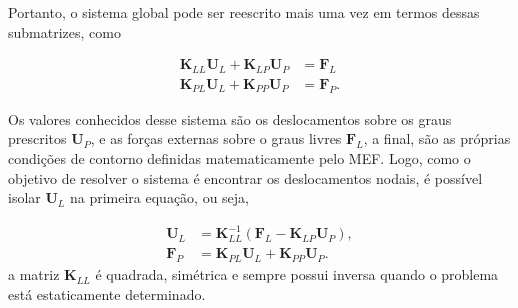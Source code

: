 Portanto, o sistema global pode ser reescrito mais uma vez em termos dessas submatrizes, como

\begin{align}
    \bm{K}_{LL} \bm{U}_L + \bm{K}_{LP} \bm{U}_P &= \bm{F}_L \\
    \bm{K}_{PL} \bm{U}_L + \bm{K}_{PP} \bm{U}_P &= \bm{F}_P.
\end{align}

Os valores conhecidos desse sistema são os deslocamentos sobre os graus prescritos $\bm{U}_P$, e as forças externas sobre o graus livres $\bm{F}_L$, a final, são as próprias condições de contorno definidas matematicamente pelo MEF. Logo, como o objetivo de resolver o sistema é encontrar os deslocamentos nodais, é possível isolar $\bm{U}_L$ na primeira equação, ou seja,

\begin{align}
    \bm{U}_L &= \bm{K}_{LL}^{-1} (\bm{F}_L - \bm{K}_{LP} \bm{U}_P), \\
    \bm{F}_P &= \bm{K}_{PL} \bm{U}_L + \bm{K}_{PP} \bm{U}_P.
\end{align}
a matriz $\bm{K}_{LL}$ é quadrada, simétrica e sempre possui inversa quando o problema está estaticamente determinado. \cite{rao}

